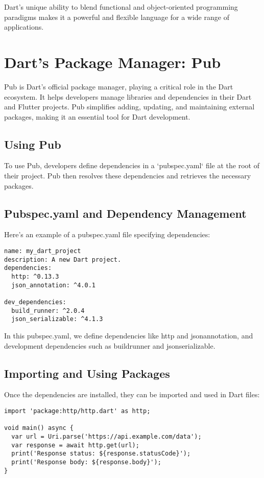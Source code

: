 \documentclass{book}
\begin{document}
Dart's unique ability to blend functional and object-oriented programming paradigms makes it a powerful and flexible language for a wide range of applications.

\chapter{Dart's Package Manager: Pub}

Pub is Dart's official package manager, playing a critical role in the Dart ecosystem. It helps developers manage libraries and dependencies in their Dart and Flutter projects. Pub simplifies adding, updating, and maintaining external packages, making it an essential tool for Dart development.

\section{Using Pub}
To use Pub, developers define dependencies in a `pubspec.yaml` file at the root of their project. Pub then resolves these dependencies and retrieves the necessary packages.

\section{Pubspec.yaml and Dependency Management}
Here's an example of a pubspec.yaml file specifying dependencies:

\begin{verbatim}
name: my_dart_project
description: A new Dart project.
dependencies:
  http: ^0.13.3
  json_annotation: ^4.0.1

dev_dependencies:
  build_runner: ^2.0.4
  json_serializable: ^4.1.3
\end{verbatim}

In this pubspec.yaml, we define dependencies like http and json\textunderscore annotation, and development dependencies such as build\textunderscore runner and json\textunderscore serializable.


\section{Importing and Using Packages}
Once the dependencies are installed, they can be imported and used in Dart files:

\begin{verbatim}
import 'package:http/http.dart' as http;

void main() async {
  var url = Uri.parse('https://api.example.com/data');
  var response = await http.get(url);
  print('Response status: ${response.statusCode}');
  print('Response body: ${response.body}');
}
\end{verbatim}
\end{document}
